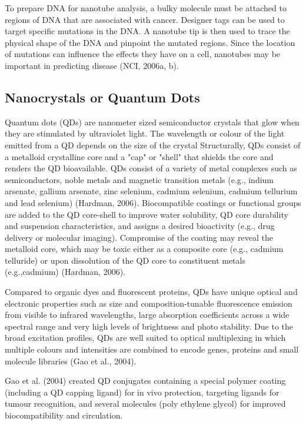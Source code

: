 \documentclass{article}
\begin{document}
\begin{multicols}
To prepare DNA for nanotube analysis, a bulky molecule must be attached
to regions of DNA that are associated with
cancer. Designer tags can be used to target
specific mutations in the DNA. A nanotube
tip is then used to trace the physical shape
of the DNA and pinpoint the mutated regions. Since the location of mutations can
influence the effects they have on a cell, nanotubes may be important in predicting disease (NCI, 2006a, b).

\subsection{Nanocrystals or Quantum Dots}Quantum dots (QDs) are nanometer sized semiconductor crystals that glow when they are stimulated by ultraviolet light. The wavelength or colour of the light emitted from a QD depends on the size of the crystal
Structurally, QDs consist of a metalloid crystalline core and a "cap" or "shell" that shields the core and renders the QD bioavailable. QDs consist of a variety of metal complexes such as semiconductors, noble metals and magnetic transition metals (e.g., indium arsenate, gallium arsenate, zinc selenium, cadmium selenium, cadmium tellurium and lead selenium) (Hardman, 2006). Biocompatible coatings or functional groups are added to the QD core-shell to improve water solubility, QD core durability and suspension characteristics, and assigns a desired bioactivity (e.g., drug delivery or molecular imaging). Compromise of the coating may reveal the metalloid core, which may be toxic either as a composite core (e.g., cadmium telluride) or upon dissolution of the QD core to constituent metals (e.g.,cadmium) (Hardman, 2006). 

Compared to organic dyes and fluorescent proteins, QDs have unique optical and electronic properties such as size and composition-tunable fluorescence emission from visible to infrared wavelengths,  large absorption coefficients across a wide spectral range and very high levels of brightness and photo stability. Due to the broad excitation profiles, QDs are well suited to optical multiplexing in which multiple colours and intensities are combined to encode genes, proteins and small molecule libraries (Gao et al., 2004).

Gao et al. (2004) created QD conjugates containing a special polymer coating (including a QD capping ligand) for in vivo protection, targeting ligands for tumour recognition, and several molecules (poly ethylene glycol) for improved biocompatibility and circulation. 


\end{multicols}
\end{document}
